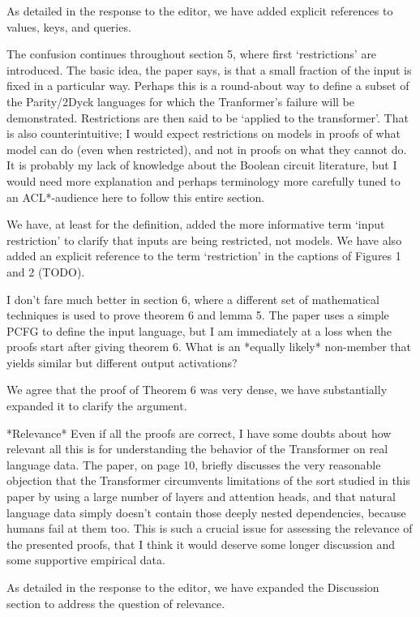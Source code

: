 \documentclass[11pt,a4paper]{article}
\newcounter{theorem}
\newcommand\response[1]{{\color{blue}#1}}
\begin{document}
\response{As detailed in the response to the editor, we have added explicit references to values, keys, and queries.}

The confusion continues throughout section 5, where first ‘restrictions’
are introduced. The basic idea, the paper says, is that a small fraction of
the input is fixed in a particular way. Perhaps this is a round-about way to
define a subset of the Parity/2Dyck languages for which the Tranformer’s
failure will be demonstrated. Restrictions are then said to be ‘applied to
the transformer’. That is also counterintuitive; I would expect
restrictions on models in proofs of what model can do (even when
restricted), and not in proofs on what they cannot do. It is probably my
lack of knowledge about the Boolean circuit literature, but I would need
more explanation and perhaps terminology more carefully tuned to an
ACL*-audience here to follow this entire section.

\response{We have, at least for the definition, added the more informative term `input restriction' to clarify that inputs are being restricted, not models. We have also added an explicit reference to the term `restriction' in the captions of Figures 1 and 2 (TODO).}

I don’t fare much better in section 6, where a different set of
mathematical techniques is used to prove theorem 6 and lemma 5. The paper
uses a simple PCFG to define the input language, but I am immediately at a
loss when the proofs start after giving theorem 6. What is an *equally
likely* non-member that yields similar but different output activations?

\response{We agree that the proof of Theorem 6 was very dense, we have substantially expanded it to clarify the argument.}

*Relevance*
Even if all the proofs are correct, I have some doubts about how relevant
all this is for understanding the behavior of the Transformer on real
language data. The paper, on page 10, briefly discusses the very reasonable
objection that the Transformer circumvents limitations of the sort studied
in this paper by using a large number of layers and attention heads, and
that natural language data simply doesn’t contain those deeply nested
dependencies, because humans fail at them too. This is such a crucial issue
for assessing the relevance of the presented proofs, that I think it would
deserve some longer discussion and some supportive empirical data.

\response{As detailed in the response to the editor, we have expanded the Discussion section to address the question of relevance.}
\end{document}
